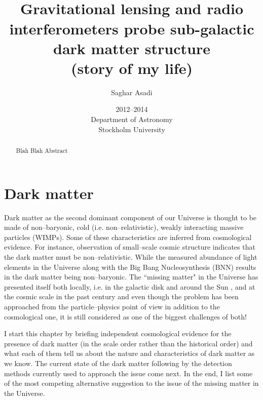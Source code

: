 \documentclass[paper=a4, fontsize=11pt]{scrartcl} %
\title{    
\normalfont \normalsize 
\horrule{0.5pt} \\[0.4cm] %
\huge  Gravitational lensing and radio interferometers probe sub-galactic dark matter structure\\
\large (story of my life) %
\horrule{2pt} \\[0.5cm] %
}
\author{Saghar Asadi} %
\date{\normalsize 2012--2014 \\ Department of Astronomy \\ Stockholm University} %
\numberwithin{equation}{section} %
\numberwithin{figure}{section} %
\numberwithin{table}{section} %
\newcommand{\ignore}[1]{}
\begin{document}
\maketitle %
\newpage
\tableofcontents
\newpage

\begin{abstract}
Blah Blah Abstract
\end{abstract}

\newpage

\section{Dark matter}
Dark matter as the second dominant component of our Universe is thought to be made of non--baryonic, cold (i.e. non--relativistic), weakly interacting massive particles (WIMPs). Some of these characteristics are inferred from cosmological evidence. For instance, observation of small--scale cosmic structure indicates that the dark matter must be non--relativistic. While the measured abundance of light elements in the Universe along with the Big Bang Nucleosynthesis (BNN) results in the dark matter being non--baryonic. The ``missing matter" in the Universe has presented itself both locally, i.e. in the galactic disk and around the Sun \citep[][]{}, and at the cosmic scale in the past century and even though the problem has been approached from the particle--physics point of view in addition to the cosmological one, it is still considered as one of the biggest challenges of both! 

I start this chapter by briefing independent cosmological evidence for the presence of dark matter (in the scale order rather than the historical order) and what each of them tell us about the nature and characteristics of dark matter as we know. The current state of the dark matter following by the detection methods currently used to approach the issue come next. In the end, I list some of the most competing alternative suggestion to the issue of the missing matter in the Universe.
 
\ignore{On the one hand, modern data suggests an insignificant amount of dark matter in the Solar vicinity which is made of baryonic but not luminous matter such as faint stars or Jupiter--like objects. In short, according to our current understanding of the Universe, dark matter is the dominant matter component of the Universe.}

\end{document}
